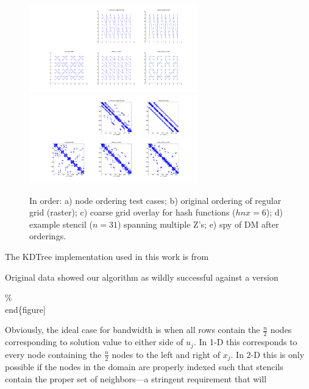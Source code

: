 \documentclass[11pt]{report}
\begin{document}
{\begin{figure}
\centering
\includegraphics[width=0.65\textwidth]{rbffd_methods_content/hashing/node_orderings-eps-converted-to.pdf} \\
\includegraphics[width=0.65\textwidth]{rbffd_methods_content/hashing/spy_regulargrid-eps-converted-to.pdf} 
\caption{In order: a) node ordering test cases; b) original ordering of regular grid (raster); c) coarse grid overlay for hash functions ($hnx = 6$); d) example stencil ($n=31$) spanning multiple Z's; e) spy of DM after orderings. }
\label{fig:orderings}
\end{figure}

The KDTree implementation used in this work is from 

Original data showed our algorithm as wildly successful against a version  


\%\\end\{figure]}





Obviously, the ideal case for bandwidth is when all rows contain the $\frac{n}{2}$ nodes corresponding to solution value to either side of $u_j$. In 1-D this corresponds to every node containing the $\frac{n}{2}$ nodes to the left and right of $x_j$. In 2-D this is only possible if the nodes in the domain are properly indexed such that stencils contain the proper set of neighbors---a stringent requirement that will 
\end{document}
